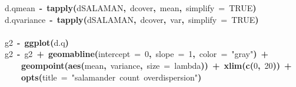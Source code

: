 \documentclass{article}
\makeatletter
\newcommand{\hlnumber}[1]{\textcolor[rgb]{0,0,0}{#1}}%
\newcommand{\hlfunctioncall}[1]{\textcolor[rgb]{.5,0,.33}{\textbf{#1}}}%
\newcommand{\hlstring}[1]{\textcolor[rgb]{.6,.6,1}{#1}}%
\newcommand{\hlkeyword}[1]{\textbf{#1}}%
\newcommand{\hlargument}[1]{\textcolor[rgb]{.69,.25,.02}{#1}}%
\newcommand{\hlassignement}[1]{\textbf{#1}}%
\newcommand{\hlsymbol}[1]{#1}%
\newcommand{\hlstd}[1]{\textcolor[rgb]{0,0,0}{#1}}%
\newenvironment{kframe}{%
 \def\FrameCommand##1{\hskip\@totalleftmargin \hskip-\fboxsep
 \colorbox{shadecolor}{##1}\hskip-\fboxsep
     \hskip-\linewidth \hskip-\@totalleftmargin \hskip\columnwidth}%
 \MakeFramed {\advance\hsize-\width
   \@totalleftmargin\z@ \linewidth\hsize
   \@setminipage}}%
 {\par\unskip\endMakeFramed}
\newenvironment{knitrout}{}{} %
\makeatother
\begin{document}
\begin{knitrout}
{\begin{kframe}
\begin{flushleft}
\hlstd{}\hlsymbol{d.q}\hlkeyword{\usebox{\hlnormalsizeboxdollar}}\hlsymbol{mean}{\ }\hlassignement{\usebox{\hlnormalsizeboxlessthan}-}{\ }\hlfunctioncall{tapply}\hlkeyword{(}\hlsymbol{d}\hlkeyword{\usebox{\hlnormalsizeboxdollar}}\hlsymbol{SALAMAN}\hlkeyword{,}{\ }\hlsymbol{d}\hlkeyword{\usebox{\hlnormalsizeboxdollar}}\hlsymbol{cover}\hlkeyword{,}{\ }\hlsymbol{mean}\hlkeyword{,}{\ }\hlargument{simplify}{\ }\hlargument{=}{\ }\hlnumber{TRUE}\hlkeyword{)}\hspace*{\fill}\\
\hlstd{}\hlsymbol{d.q}\hlkeyword{\usebox{\hlnormalsizeboxdollar}}\hlsymbol{variance}{\ }\hlassignement{\usebox{\hlnormalsizeboxlessthan}-}{\ }\hlfunctioncall{tapply}\hlkeyword{(}\hlsymbol{d}\hlkeyword{\usebox{\hlnormalsizeboxdollar}}\hlsymbol{SALAMAN}\hlkeyword{,}{\ }\hlsymbol{d}\hlkeyword{\usebox{\hlnormalsizeboxdollar}}\hlsymbol{cover}\hlkeyword{,}{\ }\hlsymbol{var}\hlkeyword{,}{\ }\hlargument{simplify}{\ }\hlargument{=}{\ }\hlnumber{TRUE}\hlkeyword{)}\hspace*{\fill}\\
\hlstd{}\hspace*{\fill}\\
\hlstd{}\hlsymbol{g2}{\ }\hlassignement{\usebox{\hlnormalsizeboxlessthan}-}{\ }\hlfunctioncall{ggplot}\hlkeyword{(}\hlsymbol{d.q}\hlkeyword{)}\hspace*{\fill}\\
\hlstd{}\hlsymbol{g2}{\ }\hlassignement{\usebox{\hlnormalsizeboxlessthan}-}{\ }\hlsymbol{g2}{\ }\hlkeyword{+}{\ }\hlfunctioncall{geom\usebox{\hlnormalsizeboxunderscore}abline}\hlkeyword{(}\hlargument{intercept}{\ }\hlargument{=}{\ }\hlnumber{0}\hlkeyword{,}{\ }\hlargument{slope}{\ }\hlargument{=}{\ }\hlnumber{1}\hlkeyword{,}{\ }\hlargument{color}{\ }\hlargument{=}{\ }\hlstring{"gray"}\hlkeyword{)}{\ }\hlkeyword{+}\hspace*{\fill}\\
\hlstd{}{\ }{\ }{\ }{\ }\hlfunctioncall{geom\usebox{\hlnormalsizeboxunderscore}point}\hlkeyword{(}\hlfunctioncall{aes}\hlkeyword{(}\hlsymbol{mean}\hlkeyword{,}{\ }\hlsymbol{variance}\hlkeyword{,}{\ }\hlargument{size}{\ }\hlargument{=}{\ }\hlsymbol{lambda}\hlkeyword{)}\hlkeyword{)}{\ }\hlkeyword{+}{\ }\hlfunctioncall{xlim}\hlkeyword{(}\hlfunctioncall{c}\hlkeyword{(}\hlnumber{0}\hlkeyword{,}{\ }\hlnumber{20}\hlkeyword{)}\hlkeyword{)}{\ }\hlkeyword{+}\hspace*{\fill}\\
\hlstd{}{\ }{\ }{\ }{\ }\hlfunctioncall{opts}\hlkeyword{(}\hlargument{title}{\ }\hlargument{=}{\ }\hlstring{"salamander{\ }count{\ }overdispersion"}\hlkeyword{)}\hspace*{\fill}\\

\end{flushleft}
\end{kframe}}
\end{knitrout}
\end{document}

